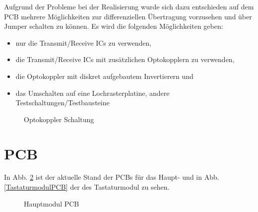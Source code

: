 Aufgrund der Probleme bei der Realisierung wurde sich dazu entschieden auf dem PCB mehrere Möglichkeiten zur differenziellen Übertragung vorzusehen 
und über Jumper schalten zu können. 
Es wird die folgenden Möglichkeiten geben:

\begin{itemize}
\item nur die Transmit/Receive ICs zu verwenden,
\item die Transmit/Receive ICs mit zusätzlichen Optokopplern zu verwenden,
\item die Optokoppler mit diskret aufgebautem Invertierern und
\item das Umschalten auf eine Lochrasterplatine, andere Testschaltungen/Testbausteine
\end{itemize}



\begin{figure}[H]
    \centering    
    \caption{Optokoppler Schaltung}
    \label{Optokoppler}
\end{figure}



\newpage
\section{PCB}
In Abb. \ref{hauptmodulPCB} ist der aktuelle Stand der PCBs für das Haupt- und in Abb. \ref{TastaturmodulPCB} der des Tastaturmodul zu sehen.

\begin{figure}[H]
    \centering    
    \caption{Hauptmodul PCB}
    \label{hauptmodulPCB}
\end{figure}

